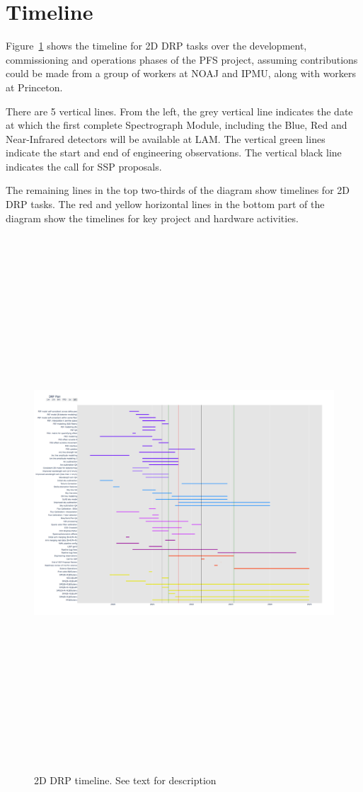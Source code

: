 \section{Timeline}
\label{sect:timeline}

Figure~\ref{fig:timeline} shows the timeline for 2D DRP tasks over the development, commissioning and operations phases of the PFS project, assuming
contributions could be made from a group of workers at NOAJ and IPMU, along with workers at Princeton.

There are 5 vertical lines. From the left, the grey vertical line indicates the date at which the first complete Spectrograph Module, including the Blue, Red and Near-Infrared detectors will be available at LAM. The vertical green lines indicate the start and end of engineering observations. The vertical black line indicates the call for SSP proposals.

The remaining lines in the top two-thirds of the diagram show timelines for 2D DRP tasks. 
The red and yellow horizontal lines in the bottom part of the diagram
show the timelines for key project and hardware activities. 

\begin{figure}
    \includegraphics[width=25cm, height=20cm]{drp-timeline}
    \caption{2D DRP timeline. See text for description}
    \label{fig:timeline}
\end{figure}
\clearpage

\clearpage

